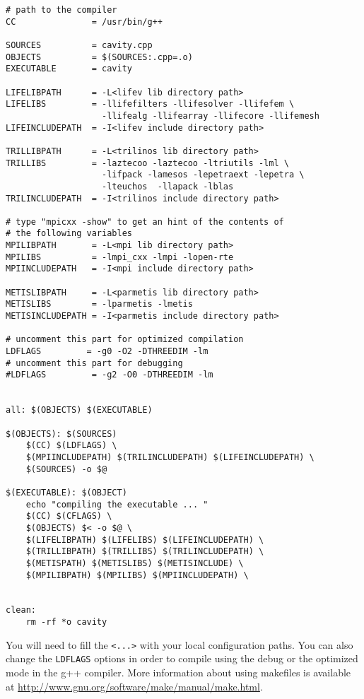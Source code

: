 \begin{verbatim}
# path to the compiler
CC               = /usr/bin/g++

SOURCES          = cavity.cpp
OBJECTS          = $(SOURCES:.cpp=.o)
EXECUTABLE       = cavity

LIFELIBPATH      = -L<lifev lib directory path>
LIFELIBS         = -llifefilters -llifesolver -llifefem \
                   -llifealg -llifearray -llifecore -llifemesh
LIFEINCLUDEPATH  = -I<lifev include directory path>

TRILLIBPATH      = -L<trilinos lib directory path>
TRILLIBS         = -laztecoo -laztecoo -ltriutils -lml \
                   -lifpack -lamesos -lepetraext -lepetra \
                   -lteuchos  -llapack -lblas
TRILINCLUDEPATH  = -I<trilinos include directory path>

# type "mpicxx -show" to get an hint of the contents of
# the following variables
MPILIBPATH       = -L<mpi lib directory path>
MPILIBS          = -lmpi_cxx -lmpi -lopen-rte
MPIINCLUDEPATH   = -I<mpi include directory path>

METISLIBPATH	 = -L<parmetis lib directory path>
METISLIBS        = -lparmetis -lmetis
METISINCLUDEPATH = -I<parmetis include directory path>

# uncomment this part for optimized compilation
LDFLAGS         = -g0 -O2 -DTHREEDIM -lm
# uncomment this part for debugging
#LDFLAGS         = -g2 -O0 -DTHREEDIM -lm


all: $(OBJECTS) $(EXECUTABLE)

$(OBJECTS): $(SOURCES)
	$(CC) $(LDFLAGS) \
	$(MPIINCLUDEPATH) $(TRILINCLUDEPATH) $(LIFEINCLUDEPATH) \
	$(SOURCES) -o $@

$(EXECUTABLE): $(OBJECT)
	echo "compiling the executable ... "
	$(CC) $(CFLAGS) \
	$(OBJECTS) $< -o $@ \
	$(LIFELIBPATH) $(LIFELIBS) $(LIFEINCLUDEPATH) \
	$(TRILLIBPATH) $(TRILLIBS) $(TRILINCLUDEPATH) \
	$(METISPATH) $(METISLIBS) $(METISINCLUDE) \
	$(MPILIBPATH) $(MPILIBS) $(MPIINCLUDEPATH) \


clean:
	rm -rf *o cavity

\end{verbatim}


You will need to fill the \verb|<...>| with your local
configuration paths. You can also change the \verb|LDFLAGS| options in order to
compile using the debug or the optimized mode in the g++ compiler. More information
about using makefiles is available at \url{http://www.gnu.org/software/make/manual/make.html}.


